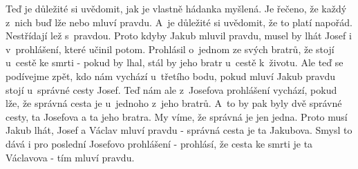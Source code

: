 Teď je důležité si uvědomit, jak je vlastně hádanka myšlená. Je řečeno, že každý z~nich buď lže nebo mluví pravdu. A~je důležité si uvědomit, že to platí napořád. Nestřídají lež s~pravdou. Proto kdyby Jakub mluvil pravdu, musel by lhát Josef i v~prohlášení, které učinil potom. Prohlásil o~jednom ze svých bratrů, že stojí u~cestě ke smrti - pokud by lhal, stál by jeho bratr u~cestě k~životu. Ale teď se podívejme zpět, kdo nám vychází u~třetího bodu, pokud mluví Jakub pravdu stojí u~správné cesty Josef. Teď nám ale z~Josefova prohlášení vychází, pokud lže, že správná cesta je u~jednoho z~jeho bratrů. A~to by pak byly dvě správné cesty, ta Josefova a ta jeho bratra. My víme, že správná je jen jedna. Proto musí Jakub lhát, Josef a Václav mluví pravdu - správná cesta je ta Jakubova. Smysl to dává i pro poslední Josefovo prohlášení - prohlásí, že cesta ke smrti je ta Václavova - tím mluví pravdu.
